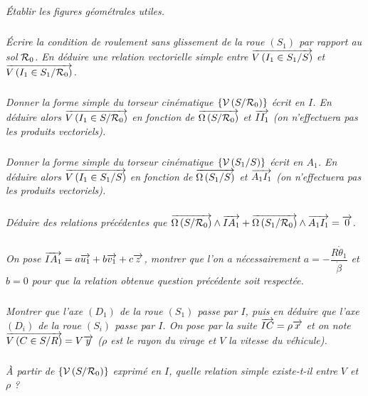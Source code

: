 \documentclass[10pt,fleqn]{article} %
\begin{document}
\begin{multicols}{2}
\subparagraph{}
\textit{Établir les figures géométrales utiles.}
\ifprof%
\begin{corrige}
\end{corrige}\else\fi

\subparagraph{}
\textit{Écrire la condition de roulement sans glissement de la roue $(S_1)$ par rapport au sol $\mathcal{R}_{0}$. En déduire une relation vectorielle simple entre $\overrightarrow{V\left( {I_1} \in {S_1}/{S}\right)}$ et $\overrightarrow{V\left( {I_1} \in {S_1}/{\mathcal{R}_{0}}\right)}$.}
\ifprof%
\begin{corrige}
\end{corrige}\else\fi

\subparagraph{}
\textit{Donner la forme simple du torseur cinématique $\left\{\mathcal{V} \left(S/\mathcal{R}_{0} \right) \right\}$ écrit en $I$. En déduire alors $\overrightarrow{V\left( {I_1} \in {S}/{\mathcal{R}_{0}}\right)}$ en fonction de $\overrightarrow{\Omega\left( {S}/{\mathcal{R}_{0}}\right)}$ et $\overrightarrow{II_1}$ (on n'effectuera pas les produits vectoriels).}
\ifprof%
\begin{corrige}
\end{corrige}\else\fi
\subparagraph{}
\textit{Donner la forme simple du torseur cinématique $\left\{\mathcal{V} \left(S_1/S \right) \right\}$ écrit en $A_1$. En déduire alors $\overrightarrow{V\left( {I_1} \in {S_1}/{S}\right)}$ en fonction de $\overrightarrow{\Omega\left( {S_1}/{S}\right)}$ et $\overrightarrow{A_1 I_1}$ (on n'effectuera pas les produits vectoriels).}
\ifprof%
\begin{corrige}
\end{corrige}\else\fi
\subparagraph{}
\textit{Déduire des relations précédentes que $\overrightarrow{\Omega\left( {S}/{\mathcal{R}_{0}}\right)}\wedge \overrightarrow{IA_1} + \overrightarrow{\Omega\left( {S_1}/{\mathcal{R}_{0}}\right)}\wedge \overrightarrow{A_1I_1}=\overrightarrow{0}$.}
\ifprof%
\begin{corrige}
\end{corrige}\else\fi
\subparagraph{}
\textit{On pose $\overrightarrow{IA_1}=a\overrightarrow{u_1}+b\overrightarrow{v_1}+c\overrightarrow{z}$, montrer que l'on a nécessairement $a=-\dfrac{R\dot{\theta}_1}{\dot{\beta}}$ et $b = 0$ pour que la relation obtenue question précédente soit respectée. }
\ifprof%
\begin{corrige}
\end{corrige}\else\fi
\subparagraph{}
\textit{ Montrer que l'axe $(D_1)$ de la roue $(S_1)$ passe par $I$,  puis en déduire que l'axe $(D_i )$ de la roue $(S_i )$ passe par $I$.  On pose par la suite $\overrightarrow{IC}=\rho \overrightarrow{x}$ et on note $\overrightarrow{V\left( {C} \in {S}/{R}\right)} =V\overrightarrow{y}$ ($\rho$ est le rayon du virage et $V$ la vitesse du véhicule).}
\ifprof%
\begin{corrige}
\end{corrige}\else\fi
\subparagraph{}
\textit{À partir de $\left\{\mathcal{V} \left(S/\mathcal{R}_{0} \right) \right\}$ exprimé en $I$, quelle relation simple existe-t-il entre $V$ et $\rho$ ?}

\end{multicols}
\end{document}
